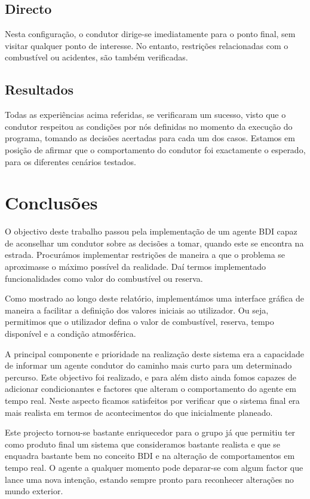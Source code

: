 \documentclass[15pt,a4paper]{article}
\begin{document}
\subsection{Directo}
Nesta configuração, o condutor dirige-se imediatamente para o ponto final, sem visitar qualquer ponto de interesse. No entanto, restrições relacionadas com o combustível ou acidentes, são também verificadas.

\subsection{Resultados}
Todas as experiências acima referidas, se verificaram um sucesso, visto que o condutor respeitou as condições por nós definidas no momento da execução do programa, tomando as decisões acertadas para cada um dos casos. Estamos em posição de afirmar que o comportamento do condutor foi exactamente o esperado, para os diferentes cenários testados.

\newpage
\section{Conclusões}
O objectivo deste trabalho passou pela implementação de um agente BDI capaz de aconselhar um condutor sobre as decisões a tomar, quando este se encontra na estrada. Procurámos implementar restrições de maneira a que o problema se aproximasse o máximo possível da realidade. Daí termos implementado funcionalidades como valor do combustível ou reserva.

Como mostrado ao longo deste relatório, implementámos uma interface gráfica de maneira a facilitar a definição dos valores iniciais ao utilizador. Ou seja, permitimos que o utilizador defina o valor de combustível, reserva, tempo disponível e a condição atmosférica.


A principal componente e prioridade na realização deste sistema era a capacidade de informar um agente condutor do caminho mais curto para um determinado percurso. Este objectivo foi realizado, e para além disto ainda fomos capazes de adicionar condicionantes e factores que alteram o comportamento do agente em tempo real. Neste aspecto ficamos satisfeitos por verificar que o sistema final era mais realista em termos de acontecimentos do que inicialmente planeado.

Este projecto tornou-se bastante enriquecedor para o grupo já que permitiu ter como produto final um sistema que consideramos bastante realista e que se enquadra bastante bem no conceito BDI e na alteração de comportamentos em tempo real. O agente a qualquer momento pode deparar-se com algum factor que lance uma nova intenção, estando sempre pronto para reconhecer alterações no mundo exterior.
\end{document}
